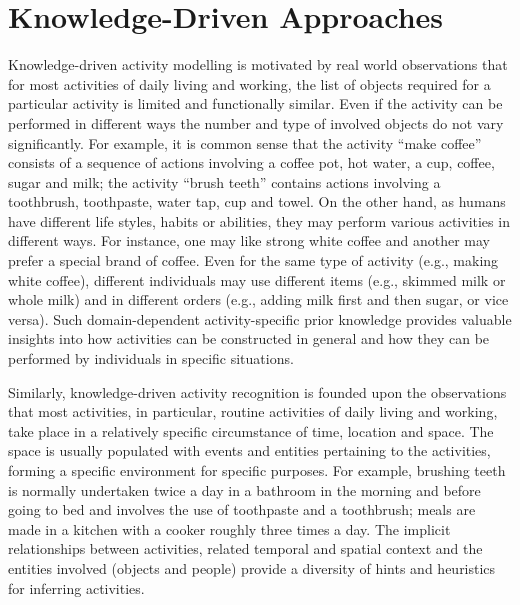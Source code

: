 \section{Knowledge-Driven Approaches}
\label{sec:soa:knowledgedriven}

Knowledge-driven activity modelling is motivated by real world observations that for most activities of daily living and working, the list of objects required for a particular activity is limited and functionally similar. Even if the activity can be performed in different ways the number and type of involved objects do not vary significantly. For example, it is common sense that the activity “make coffee” consists of a sequence of actions involving a coffee pot, hot water, a cup, coffee, sugar and milk; the activity “brush teeth” contains actions involving a toothbrush, toothpaste, water tap, cup and towel. On the other hand, as humans have different life styles, habits or abilities, they may perform various activities in different ways. For instance, one may like strong white coffee and another may prefer a special brand of coffee. Even for the same type of activity (e.g., making white coffee), different individuals may use different items (e.g., skimmed milk or whole milk) and in different orders (e.g., adding milk first and then sugar, or vice versa). Such domain-dependent activity-specific prior knowledge provides valuable insights into how activities can be constructed in general and how they can be performed by individuals in specific situations.

Similarly, knowledge-driven activity recognition is founded upon the observations that most activities, in particular, routine activities of daily living and working, take place in a relatively specific circumstance of time, location and space. The space is usually populated with events and entities pertaining to the activities, forming a specific environment for specific purposes. For example, brushing teeth is normally undertaken twice a day in a bathroom in the morning and before going to bed and involves the use of toothpaste and a toothbrush; meals are made in a kitchen with a cooker roughly three times a day. The implicit relationships between activities, related temporal and spatial context and the entities involved (objects and people) provide a diversity of hints and heuristics for inferring activities.


